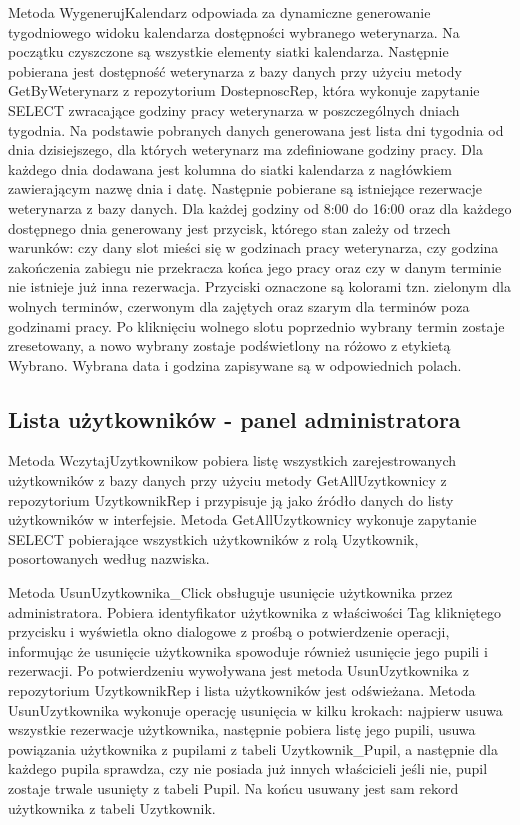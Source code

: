 Metoda WygenerujKalendarz odpowiada za dynamiczne generowanie tygodniowego widoku kalendarza dostępności wybranego 
weterynarza. Na początku czyszczone są wszystkie elementy siatki kalendarza. Następnie pobierana jest dostępność weterynarza z 
bazy danych przy użyciu metody GetByWeterynarz z repozytorium DostepnoscRep, która wykonuje 
zapytanie SELECT zwracające godziny pracy weterynarza w poszczególnych dniach tygodnia. Na podstawie pobranych danych 
generowana jest lista dni tygodnia od dnia dzisiejszego, dla których weterynarz ma zdefiniowane godziny pracy. Dla każdego dnia dodawana 
jest kolumna do siatki kalendarza z nagłówkiem zawierającym nazwę dnia i datę. Następnie pobierane są istniejące rezerwacje weterynarza z 
bazy danych. Dla każdej godziny od 8:00 do 16:00 oraz dla każdego dostępnego dnia generowany jest przycisk, którego stan zależy od trzech 
warunków: czy dany slot mieści się w godzinach pracy weterynarza, czy godzina zakończenia zabiegu nie przekracza końca jego pracy oraz czy 
w danym terminie nie istnieje już inna rezerwacja. Przyciski oznaczone są kolorami tzn. zielonym dla wolnych terminów, czerwonym dla zajętych 
oraz szarym dla terminów poza godzinami pracy. Po kliknięciu wolnego slotu poprzednio wybrany termin zostaje zresetowany, a nowo wybrany 
zostaje podświetlony na różowo z etykietą Wybrano. Wybrana data i godzina zapisywane są w odpowiednich polach.



\subsection{Lista użytkowników - panel administratora}

Metoda WczytajUzytkownikow pobiera listę wszystkich zarejestrowanych użytkowników z bazy danych przy użyciu metody 
GetAllUzytkownicy z repozytorium UzytkownikRep i przypisuje ją jako źródło danych do listy użytkowników 
w interfejsie. Metoda GetAllUzytkownicy wykonuje zapytanie SELECT pobierające wszystkich użytkowników z 
rolą Uzytkownik, posortowanych według nazwiska.

Metoda UsunUzytkownika\_Click obsługuje usunięcie użytkownika przez administratora. 
Pobiera identyfikator użytkownika z właściwości Tag klikniętego przycisku i wyświetla okno 
dialogowe z prośbą o potwierdzenie operacji, informując że usunięcie użytkownika spowoduje również usunięcie 
jego pupili i rezerwacji. Po potwierdzeniu wywoływana jest metoda UsunUzytkownika z 
repozytorium UzytkownikRep i lista użytkowników jest odświeżana. Metoda UsunUzytkownika
wykonuje operację usunięcia w kilku krokach: najpierw usuwa wszystkie rezerwacje użytkownika, następnie pobiera listę 
jego pupili, usuwa powiązania użytkownika z pupilami z tabeli Uzytkownik\_Pupil, a następnie 
dla każdego pupila sprawdza, czy nie posiada już innych właścicieli jeśli nie, pupil zostaje trwale usunięty z tabeli 
Pupil. Na końcu usuwany jest sam rekord użytkownika z tabeli Uzytkownik.

